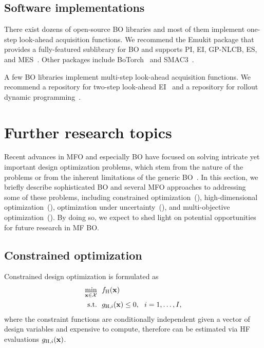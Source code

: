 \documentclass[iicol,sn-basic]{sn-jnl}%
\begin{document}
\subsection{Software implementations}\label{Sec55}

There exist dozens of open-source BO libraries and most of them implement one-step look-ahead acquisition functions.
We recommend the Emukit package that provides a fully-featured sublibrary for BO and supports PI, EI, GP-NLCB, ES, and MES~\citep{Paleyes2019}.
Other packages include BoTorch~\citep{Balandat2020} and SMAC3~\citep{Lindauer2022}.

A few BO libraries implement multi-step look-ahead acquisition functions. 
We recommend a repository for two-step look-ahead EI~\citep{WuJ2019} and a repository for rollout dynamic programming~\citep{Lee2020}.

\section{Further research topics}\label{Sec6}

Recent advances in MFO and especially BO have focused on solving intricate yet important design optimization problems, which stem from the nature of the problems or from the inherent limitations of the generic BO~\citep{Wang2023}.  
In this section, we briefly describe sophisticated BO and several MFO approaches to addressing some of these problems, including constrained optimization~(), high-dimensional optimization~(), optimization under uncertainty~(), and multi-objective optimization~().
By doing so, we expect to shed light on potential opportunities for future research in MF BO.

\subsection{Constrained optimization}\label{Sec61}

Constrained design optimization is formulated as
\begin{equation}\label{eqn58}
	\begin{aligned}
		\underset{{\bf x} \in \mathcal{X}}{\min} \ \ & f_\text{H}(\bf x)\\
		\textrm{s.t.} \ \ 
		& g_{\text{H},i}({\bf x}) \leq 0,\ \ i=1,\dots,I, 
	\end{aligned}
\end{equation}
where the constraint functions are conditionally independent given a vector of design variables and expensive to compute, therefore can be estimated via HF evaluations $g_{\text{H},i}({\bf x})$.
\end{document}
